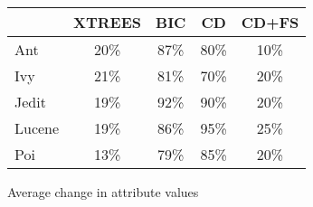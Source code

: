 \begin{figure}[!t]
\centering
{\small
\begin{tabular}{lcccc}
  \hline
  \rowcolor{lightgray}
       & XTREES & BIC   & CD   &CD+FS \\\hline
Ant    & 20\% & 87\% & 80\% & 10\%  \\
Ivy    & 21\% & 81\% & 70\% & 20\%  \\
Jedit  & 19\% & 92\% & 90\% & 20\%  \\
Lucene & 19\% & 86\% & 95\% & 25\%  \\
Poi    & 13\% & 79\% & 85\% & 20\%   \\\hline
\end{tabular}}
\noindent
\caption{Average change in attribute values}\label{fig:types}
\end{figure}